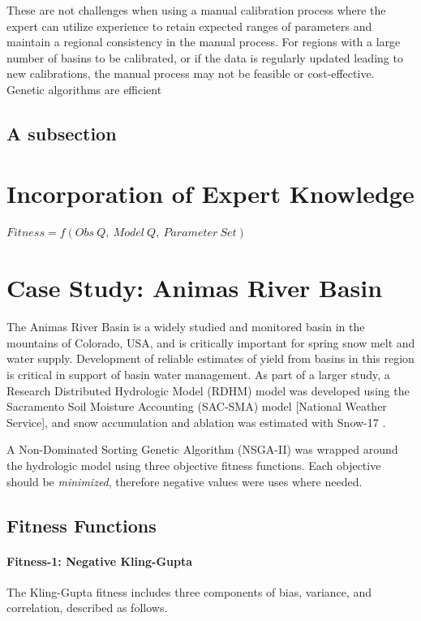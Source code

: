 \documentclass[11pt]{article} %
\begin{document}
These are not challenges when using a manual calibration process where the expert can utilize experience to retain expected ranges of parameters and maintain a regional consistency in the manual process. For regions with a large number of basins to be calibrated, or if the data is regularly updated leading to new calibrations, the manual process may not be feasible or cost-effective. Genetic algorithms are efficient 

\subsection{A subsection}



\section{Incorporation of Expert Knowledge}

$Fitness=f(Obs\:Q,\: Model\:Q,\: Parameter\: Set)$

\section{Case Study: Animas River Basin}
The Animas River Basin is a widely studied and monitored basin in the mountains of Colorado, USA, and is critically important for spring snow melt and water supply. Development of reliable estimates of yield from basins in this region is critical in support of basin water management. As part of a larger study, a Research Distributed Hydrologic Model (RDHM) model\cite{Koren2004} was developed using the Sacramento Soil Moisture Accounting (SAC-SMA) model [National Weather Service], and snow accumulation and ablation was estimated with Snow-17 \cite{Anderson2006}.

A Non-Dominated Sorting Genetic Algorithm (NSGA-II) \cite{Deb2002} was wrapped around the hydrologic model using three objective fitness functions. Each objective should be \textit{minimized}, therefore negative values were uses where needed.

\subsection{Fitness Functions}
\paragraph{Fitness-1: Negative Kling-Gupta} The Kling-Gupta\cite{Gupta2009} fitness includes three components of bias, variance, and correlation, described as follows.
\end{document}
